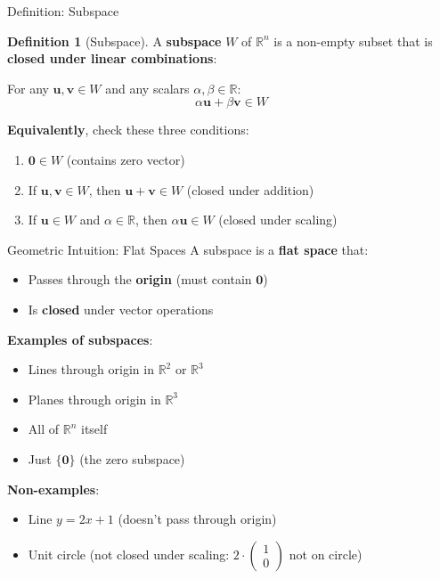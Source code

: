 \documentclass[10pt]{beamer}
\theoremstyle{definition}
\newtheorem{defi}{Definition}[section]
\newcommand{\x}[1]{\alert{\textbf{#1}}}
\begin{document}
\begin{frame}{Definition: Subspace}
\begin{defi}[Subspace]
A \x{subspace} $W$ of $\mathbb{R}^n$ is a non-empty subset that is \x{closed under linear combinations}:

For any $\mathbf{u}, \mathbf{v} \in W$ and any scalars $\alpha, \beta \in \mathbb{R}$:
$$\alpha \mathbf{u} + \beta \mathbf{v} \in W$$
\end{defi}

\vfill
\x{Equivalently}, check these three conditions:
\begin{enumerate}
\item $\mathbf{0} \in W$ (contains zero vector)
\item If $\mathbf{u}, \mathbf{v} \in W$, then $\mathbf{u} + \mathbf{v} \in W$ (closed under addition)
\item If $\mathbf{u} \in W$ and $\alpha \in \mathbb{R}$, then $\alpha \mathbf{u} \in W$ (closed under scaling)
\end{enumerate}
\end{frame}

\begin{frame}{Geometric Intuition: Flat Spaces}
A subspace is a \x{flat space} that:
\begin{itemize}
\item Passes through the \x{origin} (must contain $\mathbf{0}$)
\item Is \x{closed} under vector operations
\end{itemize}

\vfill
\x{Examples of subspaces}:
\begin{itemize}
\item Lines through origin in $\mathbb{R}^2$ or $\mathbb{R}^3$
\item Planes through origin in $\mathbb{R}^3$
\item All of $\mathbb{R}^n$ itself
\item Just $\{\mathbf{0}\}$ (the zero subspace)
\end{itemize}

\vfill
\x{Non-examples}:
\begin{itemize}
\item Line $y = 2x + 1$ (doesn't pass through origin)
\item Unit circle (not closed under scaling: $2 \cdot \begin{pmatrix} 1 \\ 0 \end{pmatrix}$ not on circle)
\end{itemize}
\end{frame}
\end{document}
